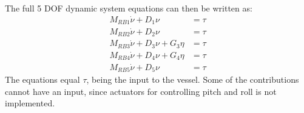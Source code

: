 The full 5 \ac{DOF} dynamic system equations can then be written as:
\begin{align}
M_{RB1}\dot \nu + D_{1} \nu &= \tau\\
M_{RB2}\dot \nu + D_{2} \nu &= \tau\\
M_{RB3}\dot \nu + D_{3} \nu + G_{3} \eta &= \tau\\
M_{RB4}\dot \nu + D_{4} \nu + G_{4} \eta &= \tau\\
M_{RB5}\dot \nu + D_{5} \nu &= \tau
\end{align}
The equations equal $\tau$, being the input to the vessel. Some of the contributions cannot have an input, since actuators for controlling pitch and roll is not implemented.

